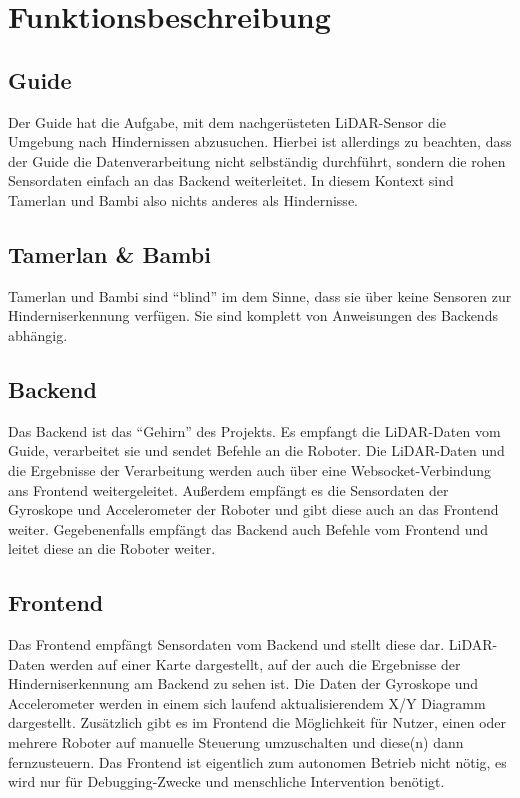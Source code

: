 \section{Funktionsbeschreibung}
\label{subsec:funktionsbeschreibung}

\subsection{Guide}
Der Guide hat die Aufgabe,
mit dem nachgerüsteten LiDAR-Sensor die Umgebung nach Hindernissen abzusuchen.
%
Hierbei ist allerdings zu beachten,
dass der Guide die Datenverarbeitung nicht selbständig durchführt,
sondern die rohen Sensordaten einfach an das Backend weiterleitet.
%
In diesem Kontext sind Tamerlan und Bambi also nichts anderes als Hindernisse.

\subsection{Tamerlan \& Bambi}
Tamerlan und Bambi sind ``blind'' im dem Sinne,
dass sie über keine Sensoren zur Hinderniserkennung verfügen.
%
Sie sind komplett von Anweisungen des Backends abhängig.

\subsection{Backend}
Das Backend ist das ``Gehirn'' des Projekts.
%
Es empfangt die LiDAR-Daten vom Guide,
verarbeitet sie
und sendet Befehle an die Roboter.
%
Die LiDAR-Daten und die Ergebnisse der Verarbeitung werden auch
über eine Websocket-Verbindung ans Frontend weitergeleitet.
%
Außerdem empfängt es die Sensordaten der Gyroskope und Accelerometer der Roboter
und gibt diese auch an das Frontend weiter. 
%
Gegebenenfalls empfängt das Backend auch Befehle vom Frontend und leitet diese an die Roboter weiter.

\subsection{Frontend}
Das Frontend empfängt Sensordaten vom Backend und stellt diese dar.
%
LiDAR-Daten werden auf einer Karte dargestellt,
auf der auch die Ergebnisse der Hinderniserkennung am Backend zu sehen ist.
%
Die Daten der Gyroskope und Accelerometer werden in einem sich laufend aktualisierendem X/Y Diagramm dargestellt.
%
Zusätzlich gibt es im Frontend die Möglichkeit für Nutzer,
einen oder mehrere Roboter auf manuelle Steuerung umzuschalten
und diese(n) dann fernzusteuern.
%
Das Frontend ist eigentlich zum autonomen Betrieb nicht nötig,
es wird nur für Debugging-Zwecke und menschliche Intervention benötigt.

